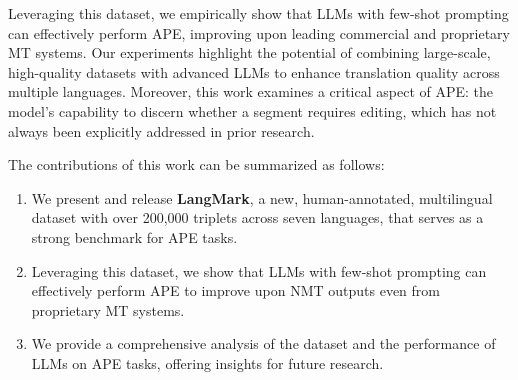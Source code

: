 \documentclass[11pt]{article}
\theoremstyle{plain}
\theoremstyle{definition}
\theoremstyle{remark}
\begin{document}
\begin{table}[t]
\centering
\caption{Number of triplets and average \emph{source}, \emph{NMT} and \emph{Post Edited} tokens (tokenized using \textit{tiktoken}\protect\footnotemark
) per triplet for all languages in LangMark.}
\label{tab:dataset-statistics}
\end{table}


Leveraging this dataset, we empirically show that LLMs with few-shot prompting can effectively perform APE, improving upon leading commercial and proprietary MT systems. Our experiments highlight the potential of combining large-scale, high-quality datasets with advanced LLMs to enhance translation quality across multiple languages. Moreover, this work examines a critical aspect of APE: the model’s capability to discern whether a segment requires editing, which has not always been explicitly addressed in prior research.

The contributions of this work can be summarized as follows:

\begin{enumerate}
    \item We present and release \textbf{LangMark}, a new, human-annotated, multilingual dataset with over 200,000 triplets across seven languages, that serves as a strong benchmark for APE tasks.
    \item Leveraging this dataset, we show that LLMs with few-shot prompting can effectively perform APE to improve upon NMT outputs even from proprietary MT systems.
    \item We provide a comprehensive analysis of the dataset and the performance of LLMs on APE tasks, offering insights for future research.
\end{enumerate}
\end{document}
